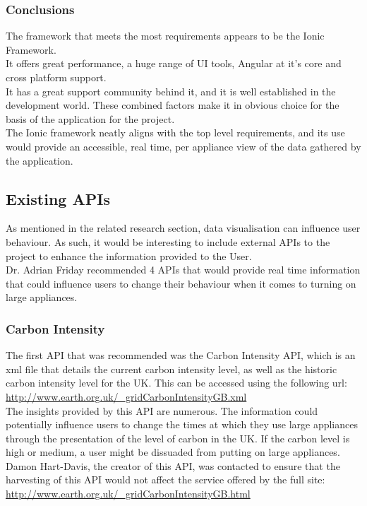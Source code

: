 \documentclass[draft,preprint,12pt,3p]{elsarticle}
\begin{document}
\subsubsection{Conclusions}
The framework that meets the most requirements appears to be the Ionic Framework.\\
It offers great performance, a huge range of UI tools, Angular at it's core and cross platform support.\\
It has a great support community behind it, and it is well established in the development world. These combined factors make it in obvious choice for the basis of the application for the project.\\
The Ionic framework neatly aligns with the top level requirements, and its use would provide an accessible, real time, per appliance view of the data gathered by the application.

\clearpage
\subsection{Existing APIs}
As mentioned in the related research section, data visualisation can influence user behaviour. As such, it would be interesting to include external APIs to the project to enhance the information provided to the User.\\
Dr. Adrian Friday recommended 4 APIs that would provide real time information that could influence users to change their behaviour when it comes to turning on large appliances.


\subsubsection{Carbon Intensity}
The first API that was recommended was the Carbon Intensity API, which is an xml file that details the current carbon intensity level, as well as the historic carbon intensity level for the UK. This can be accessed using the following url:\\[5pt]
\url{http://www.earth.org.uk/_gridCarbonIntensityGB.xml}\\[5pt]
The insights provided by this API are numerous. The information could potentially influence users to change the times at which they use large appliances through the presentation of the level of carbon in the UK. If the carbon level is high or medium, a user might be dissuaded from putting on large appliances.\\
Damon Hart-Davis, the creator of this API, was contacted to ensure that the harvesting of this API would not affect the service offered by the full site:\\[5pt]
\url{http://www.earth.org.uk/_gridCarbonIntensityGB.html}
\end{document}
